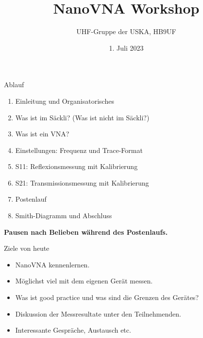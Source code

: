 \documentclass[aspectratio=169,handout]{beamer}
\title{NanoVNA Workshop}
\author{UHF-Gruppe der USKA, HB9UF}
\date{1. Juli 2023}
\begin{document}
\frame[plain]{\titlepage}

\begin{frame}{Ablauf}
    \begin{enumerate}
        \item Einleitung und Organisatorisches
        \item Was ist im Säckli? (Was ist nicht im Säckli?)
        \item Was ist ein VNA?
        \item Einstellungen: Frequenz und Trace-Format
        \item S11: Reflexionsmessung mit Kalibrierung
        \item S21: Transmissionsmessung mit Kalibrierung
        \item Postenlauf
        \item Smith-Diagramm und Abschluss
    \end{enumerate}
    \textbf{Pausen nach Belieben während des Postenlaufs.}
\end{frame}


\begin{frame}{Ziele von heute}
    \begin{itemize}
        \item NanoVNA kennenlernen.
        \item Möglichst viel mit dem eigenen Gerät messen.
        \item Was ist good practice und was sind die Grenzen des Gerätes?
        \item Diskussion der Messresultate unter den Teilnehmenden.
        \item Interessante Gespräche, Austausch etc.
    \end{itemize}
\end{frame}
\end{document}
